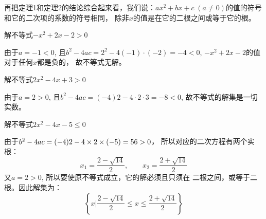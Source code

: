 \begin{center}
\end{center}

再把定理1和定理2的结论综合起来看，我们说：$ax^2+
bx+c\; (a\ne 0)$的值的符号和它的二次项的系数的符号相同，
除非$x$的值是在它的二根之间或等于它的根。



\begin{example}
 解不等式$-x^2+2x-2>0$
\end{example}

\begin{solution}
 由于$a=-1<0$, 且$b^2-4ac=2^2-4(-1)\cdot(-2)=-4<0$, $-x^2+2x-2$的值对于任何$x$都是负的，
故不等式无解。   
\end{solution}

\begin{example}
   解不等式$2x^2-4x+3>0$ 
\end{example}

\begin{solution}
    由于$a=2>0$, 且$b^2-4ac=(-4)2-4\cdot 2\cdot 3=-8<0$, 故不等式的解集是一切实数。
\end{solution}

\begin{example}
 解不等式$2x^2-4x-5\le 0$   
\end{example}

\begin{solution}
    由于$b^2-4ac=(-4)2-4\times2\times(-5)=56>0$，
所以对应的二次方程有两个实根：
\[x_1=\frac{2-\sqrt{14}}{2},\qquad x_2=\frac{2+\sqrt{14}}{2}\]
又$a=2>0$, 所以要使原不等式成立，它的解必须且只须在
二根之间，或等于二根。因此解集为：
\[\left\{x\Big|\frac{2-\sqrt{14}}{2}\le x\le \frac{2+\sqrt{14}}{2} \right\}\]
\end{solution}

